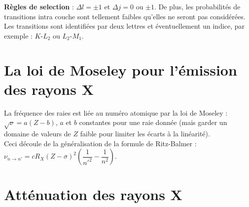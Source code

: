 \documentclass[13pt, twoside, a4paper, french, tikz]{report}
\begin{document}
      \textbf{Règles de selection} : $\Delta l = \pm 1$ et $\Delta j = 0$ ou $\pm 1$.
      De plus, les probabilités de transitions intra couche sont tellement faibles qu'elles ne seront pas considérées.\\
      
      Les transitions sont identifiées par deux lettres et éventuellement un indice, par exemple : $K$-$L_2$ ou $L_2$-$M_1$.
  
  
  \section{La loi de Moseley pour l'émission des rayons X}\label{sec:la-loi-de-moseley-pour-l'emission-des-rayons-x}
    
    La fréquence des raies est liée au numéro atomique par la loi de Moseley : $\sqrt{\nu} = a(Z-b)$, $a$ et $b$ constantes pour une raie donnée (mais garder un domaine de valeurs de $Z$ faible pour limiter les écarts à la linéarité).\\
    Ceci découle de la généralisation de la formule de Ritz-Balmer : $\nu_{n\rightarrow n'} = c R_X (Z - \sigma)^2\left(\dfrac{1}{n'^2} - \dfrac{1}{n^2}\right)$.
  
  
  \section{Atténuation des rayons X}\label{sec:attenuation-des-rayons-x}
    
\end{document}

